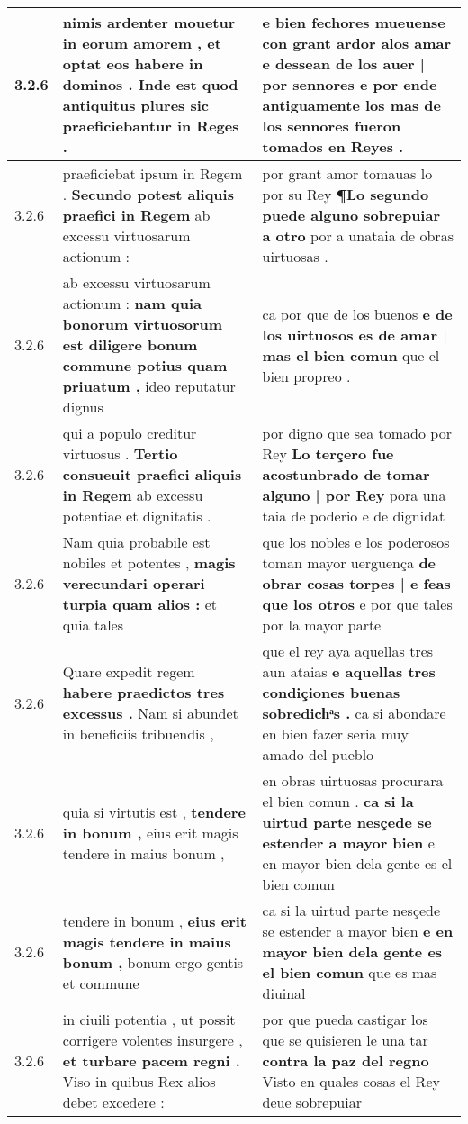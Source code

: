 \begin{tabular}{|p{1cm}|p{6.5cm}|p{6.5cm}|}
3.2.6 & nimis ardenter mouetur in eorum amorem , \textbf{ et optat eos habere in dominos . } Inde est quod antiquitus plures sic praeficiebantur in Reges . & e bien fechores mueuense con grant ardor alos amar \textbf{ e dessean de los auer | por sennores } e por ende antiguamente los mas de los sennores fueron tomados en Reyes . \\\hline
3.2.6 & praeficiebat ipsum in Regem . \textbf{ Secundo potest aliquis praefici in Regem } ab excessu virtuosarum actionum : & por grant amor tomauas lo por su Rey \textbf{ ¶Lo segundo puede alguno sobrepuiar a otro } por a unataia de obras uirtuosas . \\\hline
3.2.6 & ab excessu virtuosarum actionum : \textbf{ nam quia bonorum virtuosorum est diligere bonum commune potius quam priuatum , } ideo reputatur dignus & ca por que de los buenos \textbf{ e de los uirtuosos es de amar | mas el bien comun } que el bien propreo . \\\hline
3.2.6 & qui a populo creditur virtuosus . \textbf{ Tertio consueuit praefici aliquis in Regem } ab excessu potentiae et dignitatis . & por digno que sea tomado por Rey \textbf{ Lo terçero fue acostunbrado de tomar alguno | por Rey } pora una taia de poderio e de dignidat \\\hline
3.2.6 & Nam quia probabile est nobiles et potentes , \textbf{ magis verecundari operari turpia quam alios : } et quia tales & que los nobles e los poderosos toman mayor uerguença \textbf{ de obrar cosas torpes | e feas que los otros } e por que tales por la mayor parte \\\hline
3.2.6 & Quare expedit regem \textbf{ habere praedictos tres excessus . } Nam si abundet in beneficiis tribuendis , & que el rey aya aquellas tres aun ataias \textbf{ e aquellas tres condiçiones buenas sobredichͣs . } ca si abondare en bien fazer seria muy amado del pueblo \\\hline
3.2.6 & quia si virtutis est , \textbf{ tendere in bonum , } eius erit magis tendere in maius bonum , & en obras uirtuosas procurara el bien comun . \textbf{ ca si la uirtud parte nesçede se estender a mayor bien } e en mayor bien dela gente es el bien comun \\\hline
3.2.6 & tendere in bonum , \textbf{ eius erit magis tendere in maius bonum , } bonum ergo gentis et commune & ca si la uirtud parte nesçede se estender a mayor bien \textbf{ e en mayor bien dela gente es el bien comun } que es mas diuinal \\\hline
3.2.6 & in ciuili potentia , ut possit corrigere volentes insurgere , \textbf{ et turbare pacem regni . } Viso in quibus Rex alios debet excedere : & por que pueda castigar los que se quisieren le una tar \textbf{ contra la paz del regno } Visto en quales cosas el Rey deue sobrepuiar \\\hline

\end{tabular}
